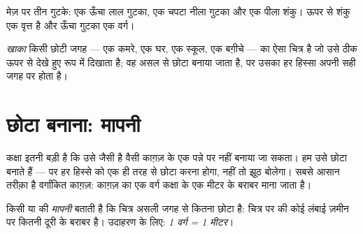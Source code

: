 \begin{omfigure}

{\small मेज़ पर तीन गुटके: एक ऊँचा लाल गुटका, एक चपटा नीला गुटका और एक
पीला शंकु। ऊपर से शंकु एक वृत्त है और ऊँचा गुटका एक वर्ग।}
\label{fig:g2:drawing-to-map:blocks}
\end{omfigure}

\begin{definition}[खाका]\label{def:g2:drawing-to-map:plan}
\emph{खाका} किसी छोटी जगह --- एक कमरे, एक घर, एक स्कूल,
एक बग़ीचे --- का ऐसा चित्र है जो उसे ठीक ऊपर से देखे हुए रूप में दिखाता
है; वह असल से छोटा बनाया जाता है, पर उसका हर हिस्सा अपनी सही जगह पर होता है।
\end{definition}

\section{छोटा बनाना: मापनी}

कक्षा इतनी बड़ी है कि उसे जैसी है वैसी काग़ज़ के एक पन्ने पर नहीं बनाया जा
सकता। हम उसे छोटा बनाते हैं --- पर हर हिस्से को एक ही तरह से छोटा करना
होगा, नहीं तो  झूठ बोलेगा। सबसे आसान तरीक़ा है वर्गांकित काग़ज़: काग़ज़
का एक वर्ग कक्षा के एक मीटर के बराबर माना जाता है।

\begin{definition}[मापनी]\label{def:g2:drawing-to-map:scale}
किसी  या  की \emph{मापनी} बताती है कि चित्र असली
जगह से कितना छोटा है: चित्र पर की कोई लंबाई ज़मीन पर कितनी दूरी के
बराबर है। उदाहरण के लिए: \emph{1 वर्ग = 1 मीटर}।
\end{definition}


